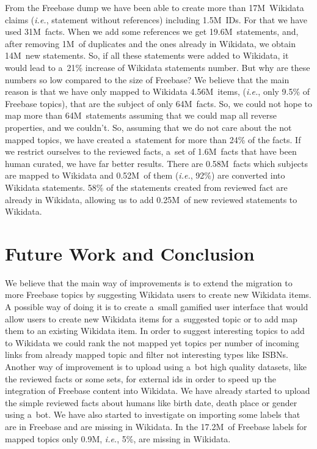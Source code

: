 \documentclass{sig-alternate}
\begin{document}
From the Freebase dump we have been able to create more than 17M~Wikidata claims
(\emph{i.e.}, statement without references) including 1.5M~IDs.
For that we have used 31M~facts.
When we add some references we get 19.6M~statements, and, after removing 1M~of duplicates
and the ones already in Wikidata, we obtain 14M~new statements.
So, if all these statements were added to Wikidata,
it would lead to a~21\% increase of Wikidata statements number.
But why are these numbers so low compared to the size of Freebase?
We believe that the main reason is that we have only mapped to Wikidata 4.56M~items, (\emph{i.e.},
only 9.5\% of Freebase topics), that are the subject of only 64M~facts.
So, we could not hope to map more than 64M~statements
assuming that we could map all reverse properties, and we couldn't.
So, assuming that we do not care about the not mapped topics,
we have created a~statement for more than 24\% of the facts.
If we restrict ourselves to the reviewed facts, a~set of 1.6M~facts
that have been human curated, we have far better results.
There are 0.58M~facts which subjects are mapped to Wikidata and 0.52M~of them
(\emph{i.e.}, 92\%) are converted into Wikidata statements.
58\% of the statements created from reviewed fact are already in Wikidata,
allowing us to add 0.25M~of new reviewed statements to Wikidata.

\section{Future Work and Conclusion}\label{sec:future-work-and-conclusion}

We believe that the main way of improvements is to extend the migration to more Freebase topics
by suggesting Wikidata users to create new Wikidata items.
A possible way of doing it is to create a~small gamified user interface that would allow users
to create new Wikidata items for a~suggested topic or to add map them to an existing Wikidata item.
In order to suggest interesting topics to add to Wikidata
we could rank the not mapped yet topics per number of incoming links from already mapped topic
and filter not interesting types like ISBNs.
Another way of improvement is to upload using a~bot high quality datasets,
like the reviewed facts or some sets,
for external ids in order to speed up the integration of Freebase content into Wikidata.
We have already started to upload the simple reviewed facts about humans
like birth date, death place or gender using a~bot.
We have also started to investigate on importing some labels
that are in Freebase and are missing in Wikidata.
In the 17.2M~of Freebase labels for mapped topics only 0.9M, \emph{i.e.},
5\%, are missing in Wikidata.
\end{document}
